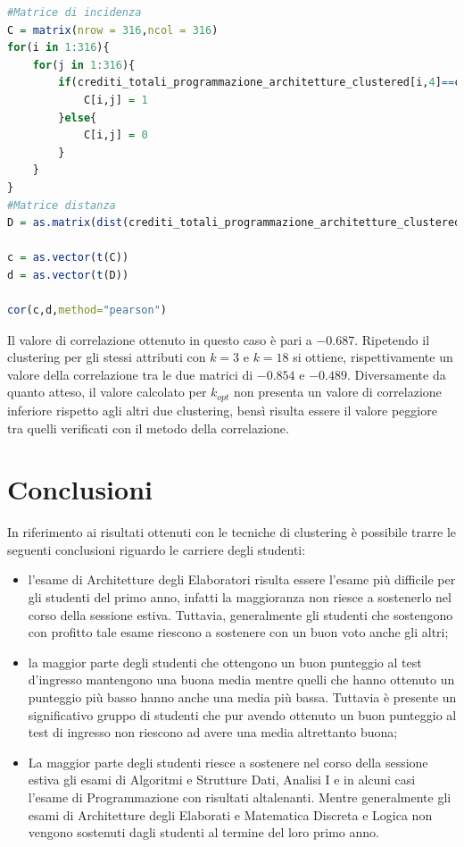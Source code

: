 \documentclass[12pt]{article}
\begin{document}
\begin{lstlisting}[caption={Calcolo Matrice di incidenza dei cluster, delle distanze e correlazione tra le due matrici.}, label={matrix-cor1}, captionpos=b, language = R]
#Matrice di incidenza
C = matrix(nrow = 316,ncol = 316)
for(i in 1:316){
    for(j in 1:316){
        if(crediti_totali_programmazione_architetture_clustered[i,4]==crediti_totali_programmazione_architetture_clustered[j,4]){
            C[i,j] = 1
        }else{
            C[i,j] = 0
        }
    }
}
#Matrice distanza
D = as.matrix(dist(crediti_totali_programmazione_architetture_clustered[,1:3],method = 'euclidean',diag = TRUE,upper = TRUE))

c = as.vector(t(C))
d = as.vector(t(D))

cor(c,d,method="pearson")
\end{lstlisting}	

Il valore di correlazione ottenuto in questo caso è pari a $-0.687$. Ripetendo il clustering per gli stessi attributi con $k=3$ e $k=18$ si ottiene, rispettivamente un valore della correlazione tra le due matrici di $-0.854$ e $-0.489$. Diversamente da quanto atteso, il valore calcolato per $k_{opt}$ non presenta un valore di correlazione inferiore rispetto agli altri due clustering, bensì risulta essere il valore peggiore tra quelli verificati con il metodo della correlazione.

\section{Conclusioni}
In riferimento ai risultati ottenuti con le tecniche di clustering è possibile trarre le seguenti conclusioni riguardo
le carriere degli studenti:

\begin{itemize}
\item l'esame di Architetture degli Elaboratori risulta essere l'esame più difficile per gli studenti del primo anno,
  infatti la maggioranza non riesce a sostenerlo nel corso della sessione estiva. Tuttavia, generalmente gli studenti 
  che sostengono con profitto tale esame riescono a sostenere con un buon voto anche gli altri; 
\item la maggior parte degli studenti che ottengono un buon punteggio al test d'ingresso mantengono una buona media
  mentre quelli che hanno ottenuto un punteggio più basso hanno anche una media più bassa. Tuttavia è presente
  un significativo gruppo di studenti che pur avendo ottenuto un buon punteggio al test di ingresso non riescono
  ad avere una media altrettanto buona;
\item La maggior parte degli studenti riesce a sostenere nel corso della sessione estiva gli esami di Algoritmi e 
  Strutture Dati, Analisi I e in alcuni casi l'esame di Programmazione con risultati altalenanti. Mentre 
  generalmente gli esami di Architetture degli Elaborati e Matematica Discreta e Logica non vengono sostenuti
  dagli studenti al termine del loro primo anno.
\end{itemize}
\end{document}
